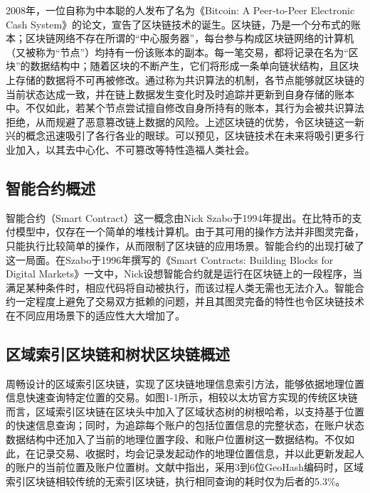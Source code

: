 2008年，一位自称为中本聪的人发布了名为《Bitcoin: A Peer-to-Peer Electronic Cash System》的论文，宣告了区块链技术的诞生。区块链，乃是一个分布式的账本；区块链网络不存在所谓的“中心服务器”，每台参与构成区块链网络的计算机（又被称为“节点”）均持有一份该账本的副本。每一笔交易，都将记录在名为“区块”的数据结构中；随着区块的不断产生，它们将形成一条单向链状结构，且区块上存储的数据将不可再被修改。通过称为共识算法的机制，各节点能够就区块链的当前状态达成一致，并在链上数据发生变化时及时追踪并更新到自身存储的账本中。不仅如此，若某个节点尝试擅自修改自身所持有的账本，其行为会被共识算法拒绝，从而规避了恶意篡改链上数据的风险。上述区块链的优势，令区块链这一新兴的概念迅速吸引了各行各业的眼球。可以预见，区块链技术在未来将吸引更多行业加入，以其去中心化、不可篡改等特性造福人类社会。

\subsection{智能合约概述}

智能合约（Smart Contract）这一概念由Nick Szabo于1994年提出。在比特币的支付模型中，仅存在一个简单的堆栈计算机。由于其可用的操作方法并非图灵完备，只能执行比较简单的操作，从而限制了区块链的应用场景。智能合约的出现打破了这一局面。在Szabo于1996年撰写的《Smart Contracts: Building Blocks for Digital Markets》一文\cite{nickSzabo}中，Nick设想智能合约就是运行在区块链上的一段程序，当满足某种条件时，相应代码将自动被执行，而该过程人类无需也无法介入。智能合约一定程度上避免了交易双方抵赖的问题，并且其图灵完备的特性也令区块链技术在不同应用场景下的适应性大大增加了。

\subsection{区域索引区块链和树状区块链概述}

周畅设计的区域索引区块链，实现了区块链地理信息索引方法，能够依据地理位置信息快速查询特定位置的交易\cite{sensors}。如图1-1所示，相较以太坊官方实现的传统区块链而言，区域索引区块链在区块头中加入了区域状态树的树根哈希，以支持基于位置的快速信息查询；同时，为追踪每个账户的包括位置信息的完整状态，在账户状态数据结构中还加入了当前的地理位置字段、和账户位置树这一数据结构。不仅如此，在记录交易、收据时，均会记录发起动作的地理位置信息，并以此更新发起人的账户的当前位置及账户位置树。文献\cite{sensors}中指出，采用3到6位GeoHash编码时，区域索引区块链相较传统的无索引区块链，执行相同查询的耗时仅为后者的5.3\%。

